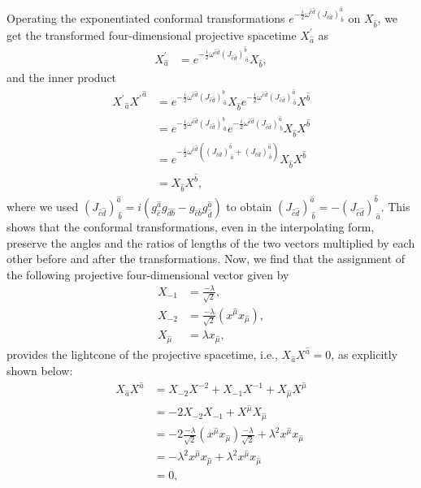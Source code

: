 \documentclass[%
 reprint,
superscriptaddress,
 amsmath,amssymb,
 aps,
]{revtex4-2}
\begin{document}
Operating the exponentiated conformal transformations $e^{-\frac{i}{2}\omega^{\hat{c}\hat{d}}(J_{\hat{c}\hat{d}})^{\hat{a}}_{~\hat{b}}}$ on $X_{\hat{b}}$, we get the transformed four-dimensional projective spacetime $X^{\prime}_{\hat{a}}$ as 
\begin{align}
\label{exponential-conformal-tranf}
  X^{\prime}_{\hat{a}}&=e^{-\frac{i}{2}\omega^{\hat{c}\hat{d}}(J_{\hat{c}\hat{d}})^{\hat{b}}_{~\hat{a}}}X_{\hat{b}},
\end{align}
and the inner product
\begin{align}
{X^{\prime}}_{\hat{a}}{X^{\prime}}^{\hat{a}} &= 
e^{-\frac{i}{2}\omega^{\hat{c}\hat{d}}(J_{\hat{c}\hat{d}})^{\hat{b}}_{~\hat{a}}}X_{\hat{b}}e^{-\frac{i}{2}\omega^{\hat{c}\hat{d}}(J_{\hat{c}\hat{d}})^{\hat{a}}_{~\hat{b}}}X^{\hat{b}}\nonumber\\
&= e^{-\frac{i}{2}\omega^{\hat{c}\hat{d}}(J_{\hat{c}\hat{d}})^{\hat{b}}_{~\hat{a}}}e^{-\frac{i}{2}\omega^{\hat{c}\hat{d}}(J_{\hat{c}\hat{d}})^{\hat{a}}_{~\hat{b}}}X_{\hat{b}}X^{\hat{b}}\nonumber\\
&= e^{-\frac{i}{2}\omega^{\hat{c}\hat{d}}((J_{\hat{c}\hat{d}})^{\hat{b}}_{~\hat{a}}+(J_{\hat{c}\hat{d}})^{\hat{a}}_{~\hat{b}})}X_{\hat{b}}X^{\hat{b}}\nonumber\\
&= X_{\hat{b}}X^{\hat{b}},
\end{align}
where we used $(J_{{\hat{c}}{\hat{d}}})^{\hat{a}}_{~\hat{b}}=i(g_{\hat{c}}^{\hat{a}} g_{{\hat{d}}{\hat{b}}}-g_{{\hat{c}}{\hat{b}}} g_{\hat{d}}^{\hat{a}})$ to obtain $(J_{\hat{c}\hat{d}})^{\hat{a}}_{~\hat{b}}=-(J_{\hat{c}\hat{d}})^{\hat{b}}_{~\hat{a}}$.
This shows that the conformal transformations, even in the interpolating form, preserve the angles and the ratios of lengths of the two vectors multiplied by each other before and after the transformations. Now, we find that the assignment of the following projective four-dimensional vector given by 
\begin{align}
    {X}_{-1}&=\frac{-\lambda}{\sqrt{2}}, \nonumber\\
    {X}_{-2}&=\frac{-\lambda}{\sqrt{2}}(x^{\hat{\mu}}x_{\hat{\mu}}), \nonumber \\
     {X}_{\hat{\mu}}&=\lambda x_{\hat{\mu}},\label{X-mu}
\end{align}
provides the lightcone of the projective spacetime, i.e., ${X}_{\hat{a}}{X}^{\hat{a}}=0$, as explicitly shown below: 
\begin{align}
    {X}_{\hat{a}}{X}^{\hat{a}}&={X}_{-2}{X}^{-2}+{X}_{-1}{X}^{-1}+{X}_{\hat{\mu}}{X}^{\hat{\mu}} \nonumber \\
    &=-2{X}_{-2}{X}_{-1}+{X}^{\hat{\mu}}{X}_{\hat{\mu}}\nonumber \\
     &=-2\frac{-\lambda}{\sqrt{2}}(x^{\hat{\mu}}x_{\hat{\mu}})\frac{-\lambda}{\sqrt{2}}+\lambda^2{x}^{\hat{\mu}}{x}_{\hat{\mu}}\nonumber \\
     &=-\lambda^2{x}^{\hat{\mu}}{x}_{\hat{\mu}}+\lambda^2{x}^{\hat{\mu}}{x}_{\hat{\mu}}\nonumber \\
     &=0,
\end{align}
\end{document}

